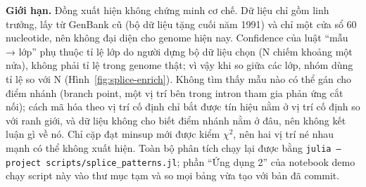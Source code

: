 \textbf{Giới hạn.} Đồng xuất hiện không chứng minh cơ chế. Dữ liệu chỉ gồm linh trưởng, lấy từ GenBank cũ (bộ
dữ liệu tặng cuối năm 1991) và chỉ một cửa sổ 60 nucleotide, nên không đại diện cho genome hiện nay. Confidence
của luật ``mẫu → lớp'' phụ thuộc tỉ lệ lớp do người dựng bộ dữ liệu chọn (N chiếm khoảng một nửa), không phải tỉ lệ trong
genome thật; vì vậy khi so giữa các lớp, nhóm dùng tỉ lệ so với N (Hình~\ref{fig:splice-enrich}). Không tìm
thấy mẫu nào có thể gán cho điểm nhánh (branch point, một vị trí bên trong intron tham gia phản ứng cắt nối);
cách mã hóa theo vị trí cố định chỉ bắt được tín hiệu nằm ở vị trí cố định so với ranh giới, và dữ liệu không
cho biết điểm nhánh nằm ở đâu, nên không kết luận gì về nó. Chỉ cặp đạt minsup mới được
kiểm $\chi^2$, nên hai vị trí né nhau mạnh có thể không xuất hiện. Toàn bộ phân tích chạy lại được bằng
\texttt{julia --project scripts/splice\_patterns.jl}; phần ``Ứng dụng 2'' của notebook demo chạy script này vào
thư mục tạm và so mọi bảng vừa tạo với bản đã commit.
